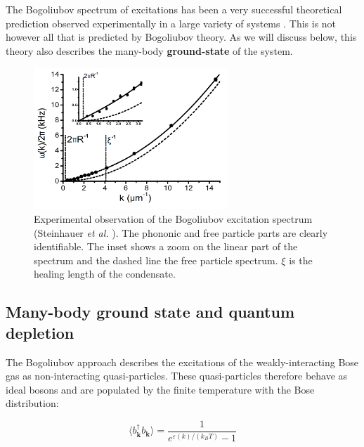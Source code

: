 The Bogoliubov spectrum of excitations has been a very successful theoretical prediction observed experimentally in a large variety of systems \cite{fontaine2018,miller1962,ozeri2005,steinhauer2002excitation,stepanov2019}. This is not however all that is predicted by Bogoliubov theory. As we will discuss below, this theory also describes  the many-body \textbf{ground-state} of the system.

\begin{figure}
    \centering
    \includegraphics[width=0.65\textwidth]{Fig/Chapter1/bogo_steinhauer.png}
    \caption[Experimental observation of the Bogoliubov excitation spectrum]{Experimental observation of the Bogoliubov excitation spectrum (Steinhauer {\it et al.} \cite{steinhauer2002excitation}). The phononic and free particle parts are clearly identifiable. The inset shows a zoom on the linear part of the spectrum and the dashed line the free particle spectrum. $\xi$ is the healing length of the condensate.}
    \label{fig:my_label}
\end{figure}

\subsection{Many-body ground state and quantum depletion}

\label{sec:many_body_ground_state}

The Bogoliubov approach describes the excitations of the weakly-interacting Bose gas as non-interacting quasi-particles. These quasi-particles therefore behave as ideal bosons and are populated by the finite temperature with the Bose distribution:

\begin{equation}
    \langle b^{\dagger}_{\bm{k}}  b_{\bm{k}} \rangle=\frac{1}{e^{\varepsilon(k)/(k_B T)}-1} 
    \label{eq:bose_qp}
\end{equation}

